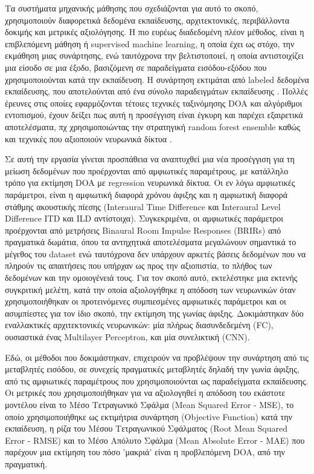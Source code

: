 Τα συστήματα μηχανικής μάθησης που σχεδιάζονται για αυτό το σκοπό, χρησιμοποιούν διαφορετικά δεδομένα εκπαίδευσης, αρχιτεκτονικές, περιβάλλοντα δοκιμής και μετρικές αξιολόγησης. Η πιο ευρέως διαδεδομένη πλέον μέθοδος, είναι η επιβλεπόμενη μάθηση ή supervised machine learning, η οποία έχει ως στόχο, την εκμάθηση μιας συνάρτησης, ενώ ταυτόχρονα την βελτιστοποιεί, η οποία αντιστοιχίζει μια είσοδο σε μια έξοδο, βασιζόμενη σε παραδείγματα εισόδου-εξόδου που χρησιμοποιούνται κατά την εκπαίδευση. Η συνάρτηση εκτιμάται από labeled δεδομένα εκπαίδευσης, που αποτελούνται από ένα σύνολο παραδειγμάτων εκπαίδευσης \cite{Russel2010, Abadi2015}. Πολλές έρευνες στις οποίες εφαρμόζονται τέτοιες τεχνικές ταξινόμησης DOA και αλγόριθμοι εντοπισμού, έχουν δείξει πως αυτή η προσέγγιση είναι έγκυρη και παρέχει εξαιρετικά αποτελέσματα, πχ χρησιμοποιώντας την στρατηγική random forest ensemble \cite{Kamaris2016, Kamaris2017, Kamaris2018} καθώς και τεχνικές που αξιοποιούν νευρωνικά δίκτυα \cite{Zhang2019, Adavanne2017, Perotin2019}.

Σε αυτή την εργασία γίνεται προσπάθεια να αναπτυχθεί μια νέα προσέγγιση για τη μείωση δεδομένων που προέρχονται από αμφιωτικές παραμέτρους, με κατάλληλο τρόπο για εκτίμηση DOA με regression νευρωνικά δίκτυα. Οι εν λόγω αμφιωτικές παράμετροι, είναι η αμφιωτική διαφορά χρόνου άφιξης και η αμφιωτική διαφορά στάθμης ακουστικής πίεσης (Interaural Time Difference και Interaural Level Difference ITD και ILD αντίστοιχα). Συγκεκριμένα, οι αμφιωτικές παράμετροι προέρχονται από μετρήσεις Binaural Room Impulse Responses (BRIRs) από πραγματικά δωμάτια, όπου τα αντηχητικά αποτελέσματα μεγαλώνουν σημαντικά το μέγεθος του dataset ενώ ταυτόχρονα δεν υπάρχουν αρκετές βάσεις δεδομένων που να πληρούν τις απαιτήσεις που υπήρχαν ως προς την αξιοπιστία, το πλήθος των δεδομένων και την ομοιογένειά τους. Για τον σκοπό αυτό, εκτελέστηκε μια εκτενής συγκριτική μελέτη, κατά την οποία αξιολογήθηκε η απόδοση των νευρωνικών όταν χρησιμοποιήθηκαν οι προτεινόμενες συμπιεσμένες αμφιωτικές παράμετροι και οι ασυμπίεστες για τον ίδιο σκοπό, την εκτίμηση της γωνίας άφιξης. Δοκιμάστηκαν δύο εναλλακτικές αρχιτεκτονικές νευρωνικών: μία πλήρως διασυνδεδεμένη (FC), ουσιαστικά ένας Multilayer Perceptron, και μία συνελικτική (CNN).

Εδώ, οι μέθοδοι που δοκιμάστηκαν, επιχειρούν να προβλέψουν την συνάρτηση από τις μεταβλητές εισόδου, σε συνεχείς πραγματικές μεταβλητές δηλαδή την γωνία άφιξης, από τις αμφιωτικές παραμέτρους που χρησιμοποιούνται ως παραδείγματα εκπαίδευσης. Οι μετρικές που χρησιμοποιήθηκαν για να αξιολογηθεί η απόδοση του εκάστοτε μοντέλου είναι το Μέσο Τετραγωνικό Σφάλμα (Mean Squared Error - MSE), το οποίο χρησιμοποιήθηκε ως εκτιμήτρια συνάρτηση (Objective Function) κατά την εκπαίδευση,  η ρίζα του Μέσου Τετραγωνικού Σφάλματος (Root Mean Squared Error - RMSE) και το Μέσο Απόλυτο Σφάλμα (Mean Absolute Error - MAE) που παρέχουν μια εκτίμηση του πόσο 'μακριά' είναι η προβλεπόμενη DOA, από την πραγματική. 

